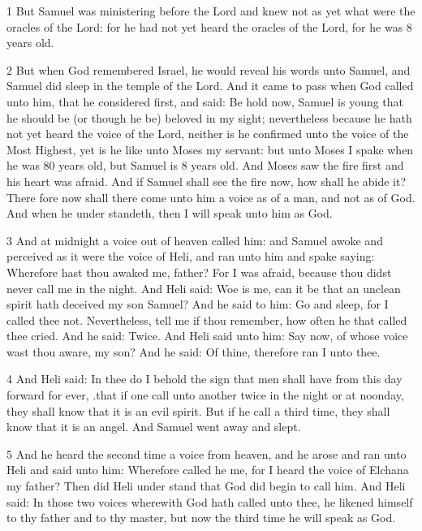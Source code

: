 \par 1 But Samuel was ministering before the Lord and knew not as yet what were the oracles of the Lord: for he had not yet heard the oracles of the Lord, for he was 8 years old. 

\par 2 But when God remembered Israel, he would reveal his words unto Samuel, and Samuel did sleep in the temple of the Lord. And it came to pass when God called unto him, that he considered first, and said: Be hold now, Samuel is young that he should be (or though he be) beloved in my sight; nevertheless because he hath not yet heard the voice of the Lord, neither is he confirmed unto the voice of the Most Highest, yet is he like unto Moses my servant: but unto Moses I spake when he was 80 years old, but Samuel is 8 years old. And Moses saw the fire first and his heart was afraid. And if Samuel shall see the fire now, how shall he abide it? There fore now shall there come unto him a voice as of a man, and not as of God. And when he under standeth, then I will speak unto him as God. 

\par 3 And at midnight a voice out of heaven called him: and Samuel awoke and perceived as it were the voice of Heli, and ran unto him and spake saying: Wherefore hast thou awaked me, father? For I was afraid, because thou didst never call me in the night. And Heli said: Woe is me, can it be that an unclean spirit hath deceived my son Samuel? And he said to him: Go and sleep, for I called thee not. Nevertheless, tell me if thou remember, how often he that called thee cried. And he said: Twice. And Heli said unto him: Say now, of whose voice wast thou aware, my son? And he said: Of thine, therefore ran I unto thee. 

\par 4 And Heli said: In thee do I behold the sign that men shall have from this day forward for ever, .that if one call unto another twice in the night or at noonday, they shall know that it is an evil spirit. But if he call a third time, they shall know that it is an angel. And Samuel went away and slept.

\par 5 And he heard the second time a voice from heaven, and he arose and ran unto Heli and said unto him: Wherefore called he me, for I heard the voice of Elchana my father? Then did Heli under stand that God did begin to call him. And Heli said: In those two voices wherewith God hath called unto thee, he likened himself to thy father and to thy master, but now the third time he will speak as God.

